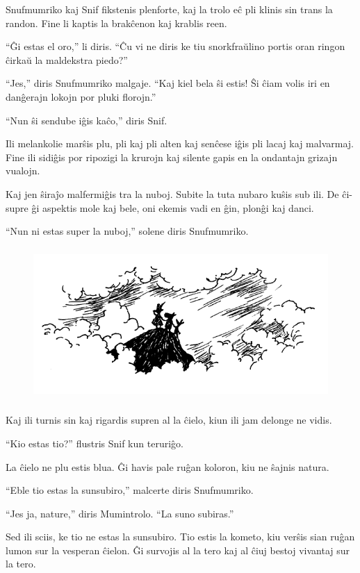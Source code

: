 Snufmumriko kaj Snif fikstenis plenforte, kaj la trolo eĉ pli klinis sin trans la randon. Fine li kaptis la brakĉenon kaj krablis reen.

``Ĝi estas el oro,'' li diris. ``Ĉu vi ne diris ke tiu snorkfraŭlino portis oran ringon ĉirkaŭ la maldekstra piedo?''

``Jes,'' diris Snufmumriko malgaje. ``Kaj kiel bela ŝi estis! Ŝi ĉiam volis iri en danĝerajn lokojn por pluki florojn.''

``Nun ŝi sendube iĝis kaĉo,'' diris Snif.

Ili melankolie marŝis plu, pli kaj pli alten kaj senĉese iĝis pli lacaj kaj malvarmaj. Fine ili sidiĝis por ripozigi la krurojn kaj silente gapis en la ondantajn grizajn vualojn.

Kaj jen ŝiraĵo malfermiĝis tra la nuboj. Subite la tuta nubaro kuŝis sub ili. De ĉi-supre ĝi aspektis mole kaj bele, oni ekemis vadi en ĝin, plonĝi kaj danci.

``Nun ni estas super la nuboj,'' solene diris Snufmumriko.

\begin{figure}[htbp]
\centering
\includegraphics[width=350pt,height=165pt]{4-4.png}
\caption{}
\label{4-4}
\end{figure}

Kaj ili turnis sin kaj rigardis supren al la ĉielo, kiun ili jam delonge ne vidis.

``Kio estas tio?'' flustris Snif kun teruriĝo.

La ĉielo ne plu estis blua. Ĝi havis pale ruĝan koloron, kiu ne ŝajnis natura.

``Eble tio estas la sunsubiro,'' malcerte diris Snufmumriko.

``Jes ja, nature,'' diris Mumintrolo. ``La suno subiras.''

Sed ili sciis, ke tio ne estas la sunsubiro. Tio estis la kometo, kiu verŝis sian ruĝan lumon sur la vesperan ĉielon. Ĝi survojis al la tero kaj al ĉiuj bestoj vivantaj sur la tero.

